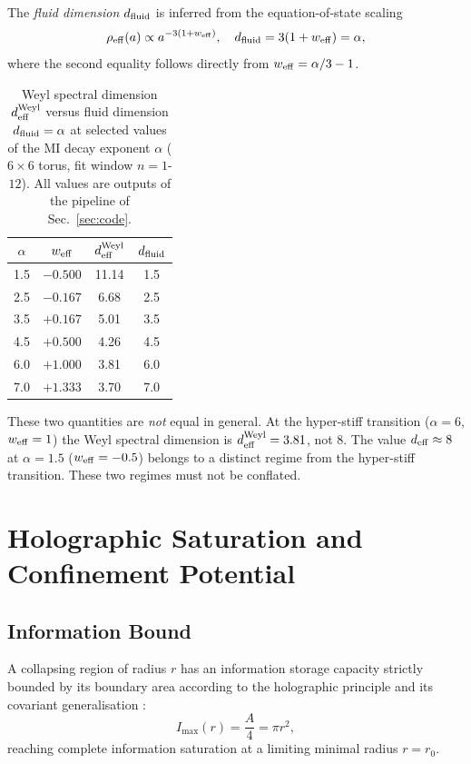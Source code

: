 \documentclass[reprint,superscriptaddress,amsmath,amssymb,aps,prd,showkeys,nofootinbib]{revtex4-2}
\begin{document}
The \emph{fluid dimension} $d_{\rm fluid}$ is inferred from the equation-of-state scaling
\begin{equation}
\rho_{\rm eff}(a)\propto a^{-3(1+w_{\rm eff})},\quad
d_{\rm fluid} = 3(1+w_{\rm eff}) = \alpha,
\end{equation}
where the second equality follows directly from $w_{\rm eff}=\alpha/3-1$.

\begin{table}[h]
\centering
\caption{Weyl spectral dimension $d_{\rm eff}^{\rm Weyl}$ versus fluid dimension
$d_{\rm fluid}=\alpha$ at selected values of the MI decay exponent $\alpha$
($6\times6$ torus, fit window $n=1$-$12$). All values are outputs of the pipeline of
Sec.~\ref{sec:code}.}
\label{tab:dims}
\begin{ruledtabular}
\begin{tabular}{cccc}
$\alpha$ & $w_{\rm eff}$ & $d_{\rm eff}^{\rm Weyl}$ & $d_{\rm fluid}$\\
\hline
1.5 & $-0.500$ & 11.14 & 1.5\\
2.5 & $-0.167$ & 6.68  & 2.5\\
3.5 & $+0.167$ & 5.01  & 3.5\\
4.5 & $+0.500$ & 4.26  & 4.5\\
6.0 & $+1.000$ & 3.81  & 6.0\\
7.0 & $+1.333$ & 3.70  & 7.0\\
\end{tabular}
\end{ruledtabular}
\end{table}

These two quantities are \emph{not} equal in general. At the hyper-stiff transition
($\alpha=6$, $w_{\rm eff}=1$) the Weyl spectral dimension is
$d_{\rm eff}^{\rm Weyl}=3.81$, not 8. The value $d_{\rm eff}\approx8$ at $\alpha=1.5$
($w_{\rm eff}=-0.5$) belongs to a distinct regime from the hyper-stiff transition.
These two regimes must not be conflated.

\section{Holographic Saturation and Confinement Potential}

\subsection{Information Bound}
A collapsing region of radius $r$ has an information storage capacity strictly bounded by
its boundary area according to the holographic principle and its covariant generalisation
\cite{tHooft1993, Susskind1995, Bousso1999}:
\begin{equation}
I_{\max}(r) = \frac{A}{4} = \pi r^2,
\end{equation}
reaching complete information saturation at a limiting minimal radius $r=r_0$.
\end{document}
